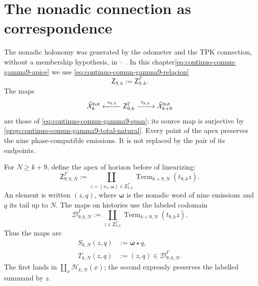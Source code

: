 \section{The nonadic connection as correspondence}

The nonadic holonomy was generated by the odometer and the TPK connection,
without a membership hypothesis, in
--
. In this chapter\eqref{eq:continuo-comun-gamma9-apice} we use
\eqref{eq:continuo-comun-gamma9-relacion}
\begin{equation}
\label{eq:pdfv2-terminal-apice-gamma9}
 \mathsf Z_{9,k}:=\mathsf Z^{\Gamma}_{9,k}.
\end{equation}
The maps
\begin{equation}
\label{eq:pdfv2-terminal-span-gamma9}
 \widehat{\mathcal X}^{\rm tot}_k
 \xleftarrow{\ s_{9,k}\ }
 \mathsf Z^{\Gamma}_{9,k}
 \xrightarrow{\ t_{9,k}\ }
 \widehat{\mathcal X}^{\rm tot}_{k+9}
\end{equation}
are those of \eqref{eq:continuo-comun-gamma9-span}; its source map is surjective by \cref{prop:continuo-comun-gamma9-total-natural}. Every point of the apex preserves the nine phase-compatible emissions. It is not replaced by the pair of its endpoints.

For \(N\geq k+9\), define the apex of horizon before of linearizing:
\begin{equation}
\label{eq:pdfv2-terminal-apice-horizonte-gamma9}
 \mathsf Z^\Gamma_{9;k,N}:=
 \coprod_{z=(\widehat x_k,\boldsymbol\omega)
            \in\mathsf Z^\Gamma_{9,k}}
 \operatorname{Term}_{k+9,N}(t_{9,k}z).
\end{equation}
An element is written \((z,q)\), where \(\boldsymbol\omega\) is the
nonadic word of nine emissions and \(q\) its tail up to \(N\). The maps on
histories use the labeled codomain
\begin{equation}
\label{eq:pdfv2-terminal-gamma9-codominio-colas}
 \mathscr D^\Gamma_{9;k,N}:=
 \coprod_{z\in\mathsf Z^\Gamma_{9,k}}
 \operatorname{Term}_{k+9,N}(t_{9,k}z).
\end{equation}
Thus the maps are
\begin{align}
 S_{k,N}(z,q)&:=\boldsymbol\omega\star q,
 \label{eq:pdfv2-terminal-gamma9-s-horizonte}\\
 T_{k,N}(z,q)&:=(z,q)\in\mathscr D^\Gamma_{9;k,N}.
 \label{eq:pdfv2-terminal-gamma9-t-horizonte}
\end{align}
The first lands in
\(\coprod_x\mathscr H_{k,N}(x)\); the second expressly preserves the
labelled summand by \(z\).

